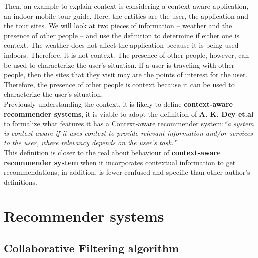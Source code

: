 Then, an example to explain context is considering a context-aware
application, an indoor mobile tour guide. Here, the
entities are the user, the application and the tour sites.  We will
look at two pieces of information – weather and the presence of other
people – and use the definition to determine if either one is context.
The weather does not affect the application because it is being used
indoors. Therefore, it is not context. The presence of other people,
however, can be used to characterize the user’s situation. If a user
is traveling with other people, then the sites that they visit may are
the points of interest for the user. Therefore, the presence of other
people is context because it can be used to characterize the user’s
situation. \\ 
Previously understanding the context, it is likely to define \textbf
{context-aware recommender systems}, it is viable to adopt the
definition of \textbf{A. K. Dey et.al}\cite{dey2001understanding} to
formalize what features it has a Context-aware recommender
system:\textit{``a system is context-aware if it uses context to
provide relevant information and/or services  to the user, where
relevancy depends on the user’s task."} \\  This definition is closer
to the real about behaviour of \textbf{context-aware recommender
system} when it incorporates contextual information to get
recommendations,  in addition, is fewer confused and specific than
other author's definitions.

\section{Recommender systems}

\subsection{Collaborative Filtering algorithm}

